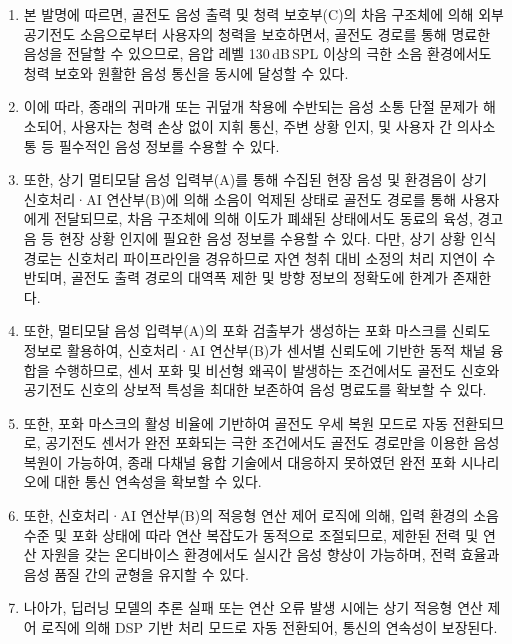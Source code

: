 \documentclass{article}
\begin{document}
\begin{enumerate}[label = \textbf{(\arabic*)}]

    \item 본 발명에 따르면, 골전도 음성 출력 및 청력 보호부(C)의 차음 구조체에 의해 외부 공기전도 소음으로부터 사용자의 청력을 보호하면서, 골전도 경로를 통해 명료한 음성을 전달할 수 있으므로, 음압 레벨 130\,dB\,SPL 이상의 극한 소음 환경에서도 청력 보호와 원활한 음성 통신을 동시에 달성할 수 있다. 
    
    \item 이에 따라, 종래의 귀마개 또는 귀덮개 착용에 수반되는 음성 소통 단절 문제가 해소되어, 사용자는 청력 손상 없이 지휘 통신, 주변 상황 인지, 및 사용자 간 의사소통 등 필수적인 음성 정보를 수용할 수 있다.

    \item 또한, 상기 멀티모달 음성 입력부(A)를 통해 수집된 현장 음성 및 환경음이 상기 신호처리·AI 연산부(B)에 의해 소음이 억제된 상태로 골전도 경로를 통해 사용자에게 전달되므로, 차음 구조체에 의해 이도가 폐쇄된 상태에서도 동료의 육성, 경고음 등 현장 상황 인지에 필요한 음성 정보를 수용할 수 있다. 다만, 상기 상황 인식 경로는 신호처리 파이프라인을 경유하므로 자연 청취 대비 소정의 처리 지연이 수반되며, 골전도 출력 경로의 대역폭 제한 및 방향 정보의 정확도에 한계가 존재한다.
    

    \item 또한, 멀티모달 음성 입력부(A)의 포화 검출부가 생성하는 포화 마스크를 신뢰도 정보로 활용하여, 신호처리·AI 연산부(B)가 센서별 신뢰도에 기반한 동적 채널 융합을 수행하므로, 센서 포화 및 비선형 왜곡이 발생하는 조건에서도 골전도 신호와 공기전도 신호의 상보적 특성을 최대한 보존하여 음성 명료도를 확보할 수 있다.

    \item 또한, 포화 마스크의 활성 비율에 기반하여 골전도 우세 복원 모드로 자동 전환되므로, 공기전도 센서가 완전 포화되는 극한 조건에서도 골전도 경로만을 이용한 음성 복원이 가능하여, 종래 다채널 융합 기술에서 대응하지 못하였던 완전 포화 시나리오에 대한 통신 연속성을 확보할 수 있다.
    
    \item 또한, 신호처리·AI 연산부(B)의 적응형 연산 제어 로직에 의해, 입력 환경의 소음 수준 및 포화 상태에 따라 연산 복잡도가 동적으로 조절되므로, 제한된 전력 및 연산 자원을 갖는 온디바이스 환경에서도 실시간 음성 향상이 가능하며, 전력 효율과 음성 품질 간의 균형을 유지할 수 있다. 
    
    \item 나아가, 딥러닝 모델의 추론 실패 또는 연산 오류 발생 시에는 상기 적응형 연산 제어 로직에 의해 DSP 기반 처리 모드로 자동 전환되어, 통신의 연속성이 보장된다.


\end{enumerate}
\end{document}
